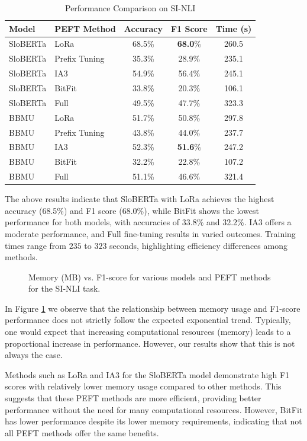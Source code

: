 \documentclass[fleqn,moreauthors,10pt]{ds_report}
\begin{document}
\begin{table}[ht]
\centering
\caption{Performance Comparison on SI-NLI}
\label{tab:nli_results}
\small
\begin{tabular}{@{}llccc@{}}
\toprule
Model & PEFT Method & Accuracy & F1 Score & Time (s)\\ \midrule
SloBERTa & LoRa & 68.5\% & \textbf{68.0}\% & 260.5 \\
SloBERTa & Prefix Tuning & 35.3\% & 28.9\% & 235.1 \\
SloBERTa & IA3 & 54.9\% & 56.4\% & 245.1 \\
SloBERTa & BitFit & 33.8\% &20.3\% & 106.1\\
SloBERTa & Full & 49.5\% & 47.7\% & 323.3 \\
BBMU & LoRa & 51.7\% & 50.8\% & 297.8 \\
BBMU & Prefix Tuning & 43.8\% & 44.0\% & 237.7 \\
BBMU & IA3 & 52.3\% & \textbf{51.6}\% & 247.2 \\
BBMU & BitFit & 32.2\% & 22.8\% & 107.2 \\
BBMU & Full & 51.1\% & 46.6\% & 321.4 \\
\bottomrule
\end{tabular}
\end{table}

The above results indicate that SloBERTa with LoRa achieves the highest accuracy (68.5\%) and F1 score (68.0\%), while BitFit shows the lowest performance for both models, with accuracies of 33.8\% and 32.2\%. IA3 offers a moderate performance, and Full fine-tuning results in varied outcomes. Training times range from $235$ to $323$ seconds, highlighting efficiency differences among methods.

\begin{figure}[ht]
    \centering
    
    \caption{Memory (MB) vs. F1-score for various models and PEFT methods for the SI-NLI task. }
    \label{fig:memory_vs_f1}
\end{figure}

In Figure \ref{fig:memory_vs_f1} we observe that  the relationship between memory usage and F1-score performance does not strictly follow the expected exponential trend. Typically, one would expect that increasing computational resources (memory) leads to a proportional increase in performance. However, our results show that this is not always the case.

Methods such as LoRa and IA3 for the SloBERTa model demonstrate high F1 scores with relatively lower memory usage compared to other methods. This suggests that these PEFT methods are more efficient, providing better performance without the need for many computational resources. However, BitFit has lower performance despite its lower memory requirements, indicating that not all PEFT methods offer the same benefits. 
\end{document}
